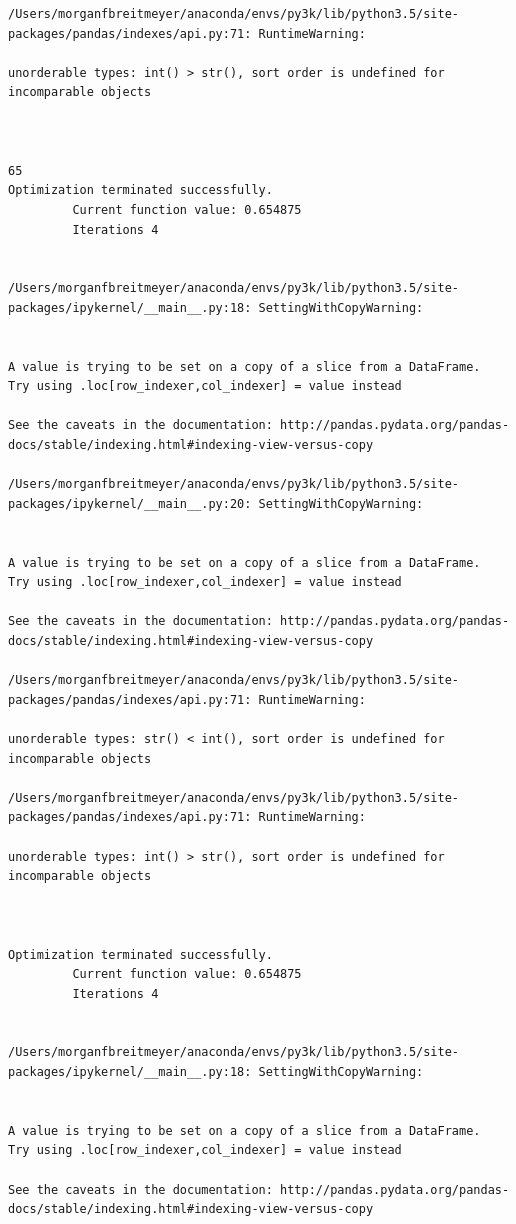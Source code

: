 \begin{lstlisting}
/Users/morganfbreitmeyer/anaconda/envs/py3k/lib/python3.5/site-packages/pandas/indexes/api.py:71: RuntimeWarning:

unorderable types: int() > str(), sort order is undefined for incomparable objects



65
Optimization terminated successfully.
         Current function value: 0.654875
         Iterations 4


/Users/morganfbreitmeyer/anaconda/envs/py3k/lib/python3.5/site-packages/ipykernel/__main__.py:18: SettingWithCopyWarning:


A value is trying to be set on a copy of a slice from a DataFrame.
Try using .loc[row_indexer,col_indexer] = value instead

See the caveats in the documentation: http://pandas.pydata.org/pandas-docs/stable/indexing.html#indexing-view-versus-copy

/Users/morganfbreitmeyer/anaconda/envs/py3k/lib/python3.5/site-packages/ipykernel/__main__.py:20: SettingWithCopyWarning:


A value is trying to be set on a copy of a slice from a DataFrame.
Try using .loc[row_indexer,col_indexer] = value instead

See the caveats in the documentation: http://pandas.pydata.org/pandas-docs/stable/indexing.html#indexing-view-versus-copy

/Users/morganfbreitmeyer/anaconda/envs/py3k/lib/python3.5/site-packages/pandas/indexes/api.py:71: RuntimeWarning:

unorderable types: str() < int(), sort order is undefined for incomparable objects

/Users/morganfbreitmeyer/anaconda/envs/py3k/lib/python3.5/site-packages/pandas/indexes/api.py:71: RuntimeWarning:

unorderable types: int() > str(), sort order is undefined for incomparable objects



Optimization terminated successfully.
         Current function value: 0.654875
         Iterations 4


/Users/morganfbreitmeyer/anaconda/envs/py3k/lib/python3.5/site-packages/ipykernel/__main__.py:18: SettingWithCopyWarning:


A value is trying to be set on a copy of a slice from a DataFrame.
Try using .loc[row_indexer,col_indexer] = value instead

See the caveats in the documentation: http://pandas.pydata.org/pandas-docs/stable/indexing.html#indexing-view-versus-copy


\end{lstlisting}
